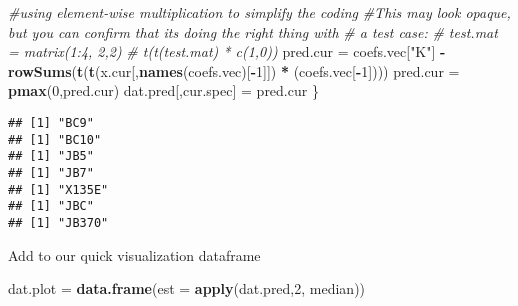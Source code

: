\documentclass[
]{article}
\newenvironment{Shaded}{\begin{snugshade}}{\end{snugshade}}
\newcommand{\AttributeTok}[1]{\textcolor[rgb]{0.13,0.29,0.53}{#1}}
\newcommand{\CommentTok}[1]{\textcolor[rgb]{0.56,0.35,0.01}{\textit{#1}}}
\newcommand{\DecValTok}[1]{\textcolor[rgb]{0.00,0.00,0.81}{#1}}
\newcommand{\FunctionTok}[1]{\textcolor[rgb]{0.13,0.29,0.53}{\textbf{#1}}}
\newcommand{\NormalTok}[1]{#1}
\newcommand{\OtherTok}[1]{\textcolor[rgb]{0.56,0.35,0.01}{#1}}
\newcommand{\SpecialCharTok}[1]{\textcolor[rgb]{0.81,0.36,0.00}{\textbf{#1}}}
\newcommand{\StringTok}[1]{\textcolor[rgb]{0.31,0.60,0.02}{#1}}
\begin{document}
\begin{Shaded}
\begin{Highlighting}[]
  \CommentTok{\#using element{-}wise multiplication to simplify the coding}
  \CommentTok{\#This may look opaque, but you can confirm that it\textquotesingle{}s doing the right thing with }
  \CommentTok{\# a test case:}
  \CommentTok{\# test.mat = matrix(1:4, 2,2)}
  \CommentTok{\# t(t(test.mat) * c(1,0))}
\NormalTok{  pred.cur }\OtherTok{=}\NormalTok{ coefs.vec[}\StringTok{"K"}\NormalTok{] }\SpecialCharTok{{-}} 
    \FunctionTok{rowSums}\NormalTok{(}\FunctionTok{t}\NormalTok{(}\FunctionTok{t}\NormalTok{(x.cur[,}\FunctionTok{names}\NormalTok{(coefs.vec)[}\SpecialCharTok{{-}}\DecValTok{1}\NormalTok{]]) }\SpecialCharTok{*}\NormalTok{ (coefs.vec[}\SpecialCharTok{{-}}\DecValTok{1}\NormalTok{])))}
\NormalTok{  pred.cur }\OtherTok{=} \FunctionTok{pmax}\NormalTok{(}\DecValTok{0}\NormalTok{,pred.cur)}
\NormalTok{  dat.pred[,cur.spec] }\OtherTok{=}\NormalTok{ pred.cur}
\NormalTok{\}}
\end{Highlighting}
\end{Shaded}

\begin{verbatim}
## [1] "BC9"
## [1] "BC10"
## [1] "JB5"
## [1] "JB7"
## [1] "X135E"
## [1] "JBC"
## [1] "JB370"
\end{verbatim}

\begin{Shaded}
\end{Shaded}

Add to our quick visualization dataframe

\begin{Shaded}
\begin{Highlighting}[]
\NormalTok{dat.plot }\OtherTok{=} \FunctionTok{data.frame}\NormalTok{(}\AttributeTok{est =} \FunctionTok{apply}\NormalTok{(dat.pred,}\DecValTok{2}\NormalTok{, median))}
\end{Highlighting}
\end{Shaded}
\end{document}
